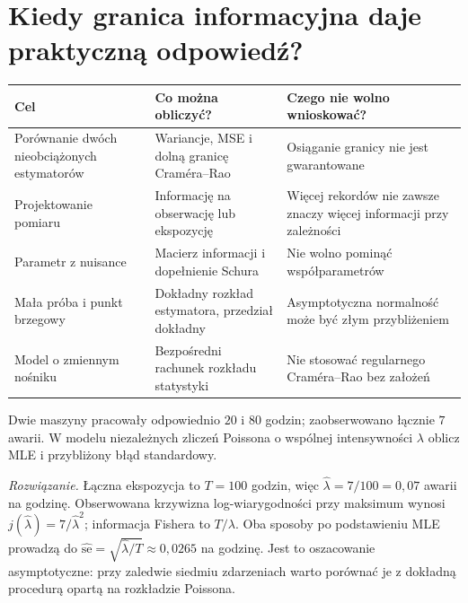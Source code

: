 \section{Kiedy granica informacyjna daje praktyczną odpowiedź?}
\begin{center}\small
\begin{tabular}{>{\raggedright\arraybackslash}p{}>{\raggedright\arraybackslash}p{}>{\raggedright\arraybackslash}p{}}
\toprule
\textbf{Cel} & \textbf{Co można obliczyć?} & \textbf{Czego nie wolno wnioskować?}\\
\midrule
Porównanie dwóch nieobciążonych estymatorów & Wariancje, MSE i dolną granicę Craméra--Rao & Osiąganie granicy nie jest gwarantowane\\
Projektowanie pomiaru & Informację na obserwację lub ekspozycję & Więcej rekordów nie zawsze znaczy więcej informacji przy zależności\\
Parametr z nuisance & Macierz informacji i dopełnienie Schura & Nie wolno pominąć współparametrów\\
Mała próba i punkt brzegowy & Dokładny rozkład estymatora, przedział dokładny & Asymptotyczna normalność może być złym przybliżeniem\\
Model o zmiennym nośniku & Bezpośredni rachunek rozkładu statystyki & Nie stosować regularnego Craméra--Rao bez założeń\\
\bottomrule
\end{tabular}
\end{center}

\begin{zadanie}
Dwie maszyny pracowały odpowiednio $20$ i $80$ godzin;
zaobserwowano łącznie $7$ awarii. W modelu niezależnych zliczeń
Poissona o wspólnej intensywności $\lambda$ oblicz MLE i
przybliżony błąd standardowy.
\par\emph{Rozwiązanie.} Łączna ekspozycja to $T=100$ godzin,
więc $\widehat\lambda=7/100=0{,}07$ awarii na godzinę.
Obserwowana krzywizna log-wiarygodności przy maksimum wynosi
$j(\widehat\lambda)=7/\widehat\lambda^2$;
informacja Fishera to $T/\lambda$.
Oba sposoby po podstawieniu MLE prowadzą do
$\widehat{\mathrm{se}}=\sqrt{\widehat\lambda/T}
\approx0{,}0265$ na godzinę. Jest to oszacowanie asymptotyczne:
przy zaledwie siedmiu zdarzeniach warto porównać je z dokładną
procedurą opartą na rozkładzie Poissona.
\end{zadanie}

